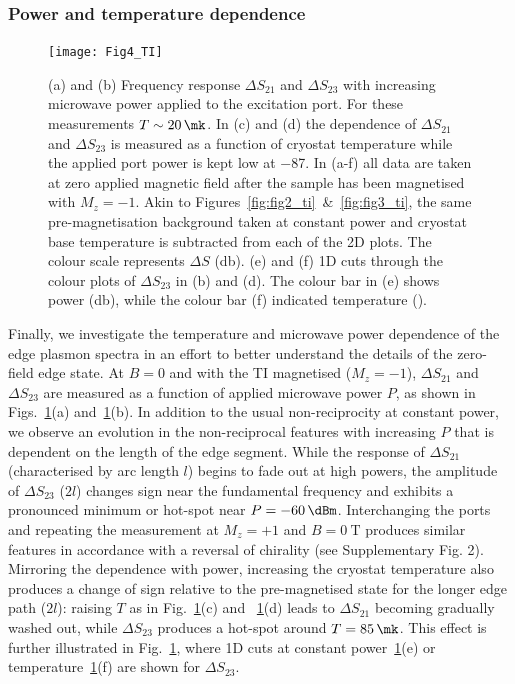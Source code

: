 \subsubsection{Power and temperature dependence} 
\begin{figure}
\texttt{[image: Fig4\_TI]}
\caption[Effect of temperature and microwave power]{\label{fig:fig4_ti}(a) and (b) Frequency response $\Delta S_{21}$ and $\Delta S_{23}$ with increasing microwave power applied to the excitation port. For these measurements $T \sim \SI{20}{\mk}$. In (c) and (d) the dependence of $\Delta S_{21}$ and $\Delta S_{23}$ is measured as a function of cryostat temperature while the applied port power is kept low at \SI{-87}{\dBm}. In (a-f)  all data are taken at zero applied magnetic field after the sample has been magnetised with $M_z=-1$. Akin to Figures~\ref{fig:fig2_ti}~\&~\ref{fig:fig3_ti}, the same pre-magnetisation background taken at constant power and cryostat base temperature is subtracted from each of the 2D plots. The colour scale represents $\Delta S$ (\si{\decibel}). (e) and (f) 1D cuts through the colour plots of $\Delta S_{23}$ in (b) and (d). The colour bar in (e) shows power (\si{\decibel}), while the colour bar (f) indicated temperature (\si{\mk}).}
\end{figure}
Finally, we investigate the temperature and microwave power dependence of the edge plasmon spectra in an effort to better understand the details of the zero-field edge state.  At $B=0$ and with the TI magnetised ($M_z=-1$), $\Delta S_{21}$ and $\Delta S_{23}$ are measured as a function of applied microwave power $P$, as shown in Figs.~\ref{fig:fig4_ti}(a) and~\ref{fig:fig4_ti}(b). In addition to the usual non-reciprocity at constant power, we observe an evolution in the non-reciprocal features with increasing $P$ that is dependent on the length of the edge segment. While the response of $\Delta S_{21}$ (characterised by arc length $l$) begins to fade out at high powers, the amplitude of $\Delta S_{23}$ ($2l$) changes sign near the fundamental frequency and exhibits a pronounced minimum or hot-spot near $P = \SI{-60}{\dBm}$. Interchanging the ports and repeating the measurement at $M_z=+1$ and $B=\SI{0}{\tesla}$ produces similar features in accordance with a reversal of chirality (see Supplementary Fig. 2). Mirroring the dependence with power, increasing the cryostat temperature also produces a change of sign relative to the pre-magnetised state for the longer edge path ($2l$): raising $T$ as in Fig.~\ref{fig:fig4_ti}(c) and ~\ref{fig:fig4_ti}(d) leads to $\Delta S_{21}$ becoming gradually washed out, while $\Delta S_{23}$ produces a hot-spot around $T = \SI{85}{\mk}$. This effect is further illustrated in Fig.~\ref{fig:fig4_ti}, where 1D cuts at constant power~\ref{fig:fig4_ti}(e) or temperature~\ref{fig:fig4_ti}(f) are shown for $\Delta S_{23}$.

